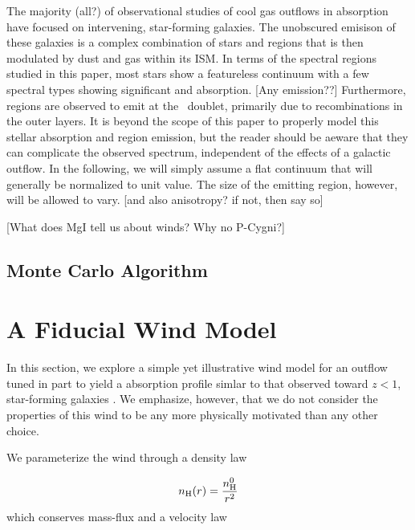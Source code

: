 \documentclass[12pt,preprint]{aastex}
\begin{document}
The majority (all?) of observational studies of cool gas outflows in
absorption have focused on intervening, star-forming galaxies.  The
unobscured emisison of these galaxies is a complex combination of
stars and  regions that is then modulated by dust and gas
within its ISM.  In terms of the spectral regions studied in this
paper, most stars show a featureless continuum with a few spectral
types showing significant  and  absorption.
[Any emission??]  Furthermore,  regions are observed to emit
at the \mgiid\ doublet, primarily due to recombinations in the outer
layers.  It is beyond the scope of this paper to properly model this
stellar absorption and  region emission, but the reader
should be aeware that they can complicate the observed spectrum,
independent of the effects of a galactic outflow.
In the following, we will simply assume a flat continuum that will
generally be normalized to unit value.  The size of the emitting
region, however, will be allowed to vary. [and also anisotropy? if
not, then say so]

[What does MgI tell us about winds?  Why no P-Cygni?]

\subsection{Monte Carlo Algorithm}

\section{A Fiducial Wind Model}
\label{sec:fiducial}

In this section, we explore a simple yet illustrative wind model for
an outflow tuned in part to yield a  absorption profile
simlar to that observed toward $z<1$, star-forming galaxies
\citep{wcp+09,rubin10b}.  We emphasize, however, that we do not
consider the properties of this wind to be any more physically
motivated than any other choice.

We parameterize the wind through a density law

\begin{equation}
n_{\rm H} (r) = \frac{n^0_{\rm H}}{r^2}
\end{equation}
which conserves mass-flux and a velocity law
\end{document}
